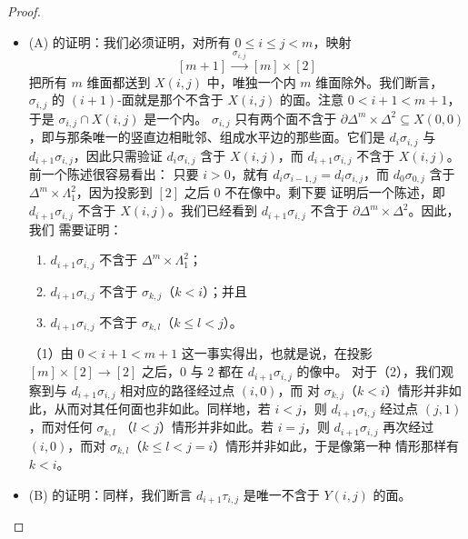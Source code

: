 \begin{proof}
\begin{itemize}
\item (A) 的证明：我们必须证明，对所有 $0 \le i \le j < m$，映射
\[
[m + 1] \xrightarrow{\ \sigma_{i,j}\ } [m] \times [2]
\]
把所有 $m$ 维面都送到 $X(i, j)$ 中，唯独一个内 $m$ 维面除外。我们断言，
$\sigma_{i,j}$ 的 $(i+1)$-面就是那个不含于 $X(i, j)$ 的面。注意
$0 < i + 1 < m + 1$，于是 $\sigma_{i,j} \cap X(i, j)$ 是一个内\trHorn{}。
$\sigma_{i,j}$ 只有两个面不含于 $\partial\Delta^m \times \Delta^2 \subseteq X(0, 0)$，即与那条唯一的竖直边相毗邻、组成水平边的那些面。它们是
$d_i\sigma_{i,j}$ 与 $d_{i+1}\sigma_{i,j}$，因此只需验证 $d_i\sigma_{i,j}$ 含于
$X(i, j)$，而 $d_{i+1}\sigma_{i,j}$ 不含于 $X(i, j)$。前一个陈述很容易看出：
只要 $i > 0$，就有 $d_i\sigma_{i-1,j} = d_i\sigma_{i,j}$，而 $d_0\sigma_{0,j}$
含于 $\Delta^m \times \Lambda^2_1$，因为投影到 $[2]$ 之后 $0$ 不在像中。剩下要
证明后一个陈述，即 $d_{i+1}\sigma_{i,j}$ 不含于 $X(i, j)$。我们已经看到
$d_{i+1}\sigma_{i,j}$ 不含于 $\partial\Delta^m \times \Delta^2$。因此，我们
需要证明：
\begin{enumerate}[label=(\arabic*)]
  \item $d_{i+1}\sigma_{i,j}$ 不含于 $\Delta^m \times \Lambda^2_1$；
  \item $d_{i+1}\sigma_{i,j}$ 不含于 $\sigma_{k,j}$（$k < i$）；并且
  \item $d_{i+1}\sigma_{i,j}$ 不含于 $\sigma_{k,l}$（$k \le l < j$）。
\end{enumerate}
（1）由 $0 < i + 1 < m + 1$ 这一事实得出，也就是说，在投影
$[m] \times [2] \to [2]$ 之后，$0$ 与 $2$ 都在 $d_{i+1}\sigma_{i,j}$ 的像中。
对于（2），我们观察到与 $d_{i+1}\sigma_{i,j}$ 相对应的路径经过点 $(i, 0)$，而
对 $\sigma_{k,j}$（$k < i$）情形并非如此，从而对其任何面也非如此。同样地，若
$i < j$，则 $d_{i+1}\sigma_{i,j}$ 经过点 $(j, 1)$，而对任何 $\sigma_{k,l}$
（$l < j$）情形并非如此。若 $i = j$，则 $d_{i+1}\sigma_{i,j}$ 再次经过
$(i, 0)$，而对 $\sigma_{k,l}$（$k \le l < j = i$）情形并非如此，于是像第一种
情形那样有 $k < i$。

\item (B) 的证明：同样，我们断言 $d_{i+1}\tau_{i,j}$ 是唯一不含于 $Y(i, j)$
的面。


\end{itemize}
\end{proof}
